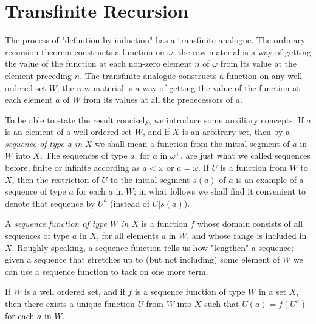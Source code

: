 
\chapter{Transfinite Recursion} 

The process of "definition by induction" has a   transfinite analogue. The ordinary recursion theorem constructs a function on $\omega$; the raw material is a way of getting the value of the function at each non-zero element $n$ of $\omega$ from its value at the element preceding $n$. The transfinite analogue constructs a function on any well ordered set $W$; the raw material is a way of getting the value of the function at each element $a$ of $W$ from its values at all the predecessors of $a$. 

To be able to state the result concisely, we introduce some auxiliary concepts: If $a$ is an element of a well ordered set $W$, and if $X$ is an arbitrary set, then by a \textit{sequence of type a in $X$} we shall mean a function from the initial segment of $a$ in $W$ into $X$. The sequences of type $a$, for $a$ in $\omega^{+}$, are just what we called sequences before, finite or infinite according as $a < \omega$ or $a =  \omega$. If $U$ is a function from $W$ to $X$, then the restriction of $U$ to the initial segment $s(a)$ of $a$ is an example of a sequence of type $a$ for each $a$ in $W$; in what follows we shall find it convenient to denote that sequence by $U^{a}$ (instead of $U | s(a)$).

A \textit{sequence function of type $W$ in $X$} is a function $f$ whose domain consists of all sequences of type $a$ in $X$, for all elements $a$ in $W$, and whose range is included in $X$. Roughly speaking, a sequence function tells us how "lengthen" a sequence; given a sequence that stretches up to (but not including) some element of $W$ we can use a sequence function to tack on one more term. 

\begin{named} If $W$ is a well ordered set, and if $f$ is a sequence function of type $W$ in a set $X$, then there exists a unique function $U$ from $W$ into $X$ such that $U(a) = f(U^{a})$ for each $a$ in $W$.
\end{named}

